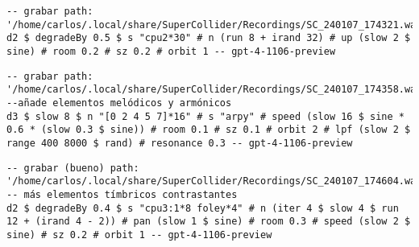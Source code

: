 \begin{minipage}[t]{1\textwidth}
    \centering
    \begin{lstlisting}[style=SuperCollider-IDE, language=ExtendedHaskell, basicstyle=\footnotesize\ttfamily, numbers=none]
-- grabar path: '/home/carlos/.local/share/SuperCollider/Recordings/SC_240107_174321.wav'
d2 $ degradeBy 0.5 $ s "cpu2*30" # n (run 8 + irand 32) # up (slow 2 $ sine) # room 0.2 # sz 0.2 # orbit 1 -- gpt-4-1106-preview                      
    \end{lstlisting}
    \vspace{1cm}
\end{minipage}





\begin{minipage}[t]{1\textwidth}
    \centering
    \begin{lstlisting}[style=SuperCollider-IDE, language=ExtendedHaskell, basicstyle=\footnotesize\ttfamily, numbers=none]
-- grabar path: '/home/carlos/.local/share/SuperCollider/Recordings/SC_240107_174358.wav'
--añade elementos melódicos y armónicos
d3 $ slow 8 $ n "[0 2 4 5 7]*16" # s "arpy" # speed (slow 16 $ sine * 0.6 * (slow 0.3 $ sine)) # room 0.1 # sz 0.1 # orbit 2 # lpf (slow 2 $ range 400 8000 $ rand) # resonance 0.3 -- gpt-4-1106-preview                    
    \end{lstlisting}
    \vspace{1cm}
\end{minipage}







\begin{minipage}[t]{1\textwidth}
    \centering
    \begin{lstlisting}[style=SuperCollider-IDE, language=ExtendedHaskell, basicstyle=\footnotesize\ttfamily, numbers=none]
-- grabar (bueno) path: '/home/carlos/.local/share/SuperCollider/Recordings/SC_240107_174604.wav'
-- más elementos tímbricos contrastantes
d2 $ degradeBy 0.4 $ s "cpu3:1*8 foley*4" # n (iter 4 $ slow 4 $ run 12 + (irand 4 - 2)) # pan (slow 1 $ sine) # room 0.3 # speed (slow 2 $ sine) # sz 0.2 # orbit 1 -- gpt-4-1106-preview                  
    \end{lstlisting}
    \vspace{1cm}
\end{minipage}








